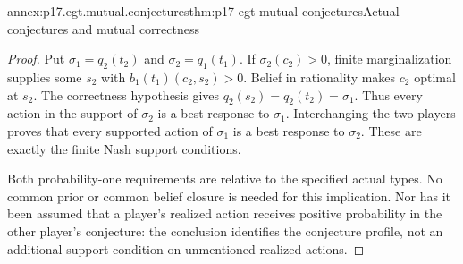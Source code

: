 \begin{annexitem}{annex:p17.egt.mutual.conjectures}{thm:p17-egt-mutual-conjectures}{Actual conjectures and mutual correctness}
\begin{proof}
Put \(\sigma_1=q_2(t_2)\) and \(\sigma_2=q_1(t_1)\).
If \(\sigma_2(c_2)>0\), finite marginalization supplies
some \(s_2\) with \(b_1(t_1)(c_2,s_2)>0\).
Belief in rationality makes \(c_2\) optimal at \(s_2\).
The correctness hypothesis gives
\(q_2(s_2)=q_2(t_2)=\sigma_1\).
Thus every action in the support of \(\sigma_2\) is a
best response to \(\sigma_1\).
Interchanging the two players proves that every supported
action of \(\sigma_1\) is a best response to \(\sigma_2\).
These are exactly the finite Nash support conditions.

Both probability-one requirements are relative to the
specified actual types. No common prior or common belief
closure is needed for this implication. Nor has it been
assumed that a player's realized action receives positive
probability in the other player's conjecture: the conclusion
identifies the conjecture profile, not an additional support
condition on unmentioned realized actions.
\end{proof}
\end{annexitem}


